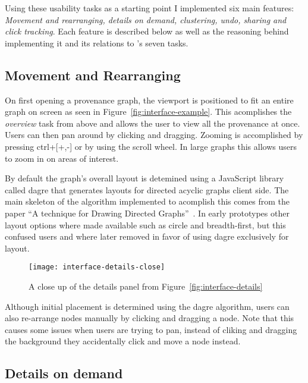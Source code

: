 Using these usability tasks as a starting point I implemented six main features: \textit{Movement and rearranging, details on demand, clustering, undo, sharing and click tracking}. Each feature is described below as well as the reasoning behind implementing it and its relations to \citeauthor{Shneiderman1996}'s seven tasks. 

\subsection{Movement and Rearranging}
\label{sec:movement_and_rearranging}

On first opening a provenance graph, the viewport is positioned to fit an entire graph on screen as seen in Figure~\ref{fig:interface-example}. This acomplishes the \textit{overview} task from above and allows the user to view all the provenance at once. Users can then pan around by clicking and dragging. Zooming is accomplished by pressing ctrl+[+,-] or by using the scroll wheel. In large graphs this allows users to zoom in on areas of interest. 

By default the graph's overall layout is detemined using a JavaScript library called dagre that generates layouts for directed acyclic graphs client side. The main skeleton of the algorithm implemented to acomplish this comes from the paper ``A technique for Drawing Directed Graphs''~\cite{Gansner1993}. In early prototypes other layout options where made available such as circle and breadth-first, but this confused users and where later removed in favor of using dagre exclusively for layout.

\begin{figure}[h]
	\centering
	\texttt{[image: interface-details-close]}
	\caption{A close up of the details panel from Figure~\ref{fig:interface-details}}
	\label{fig:key-concepts}
\end{figure}

Although initial placement is determined using the dagre algorithm, users can also re-arrange nodes manually by clicking and dragging a node. Note that this causes some issues when users are trying to pan, instead of cliking and dragging the background they accidentally click and move a node instead.

\subsection{Details on demand}
\label{sec:details_on_demand}

